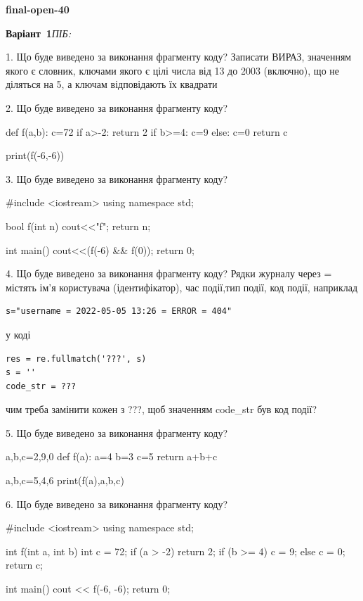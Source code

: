 \documentclass[11pt]{article}
\begin{document}
{\large\textbf{final-open-40}}

\textbf{Варіант \No\,1}\hfill \textit{ПІБ:}\,\underline{\hspace{60mm}}
\vspace{4mm}

1. Що буде виведено за виконання фрагменту коду?
Записати ВИРАЗ, значенням якого є словник, ключами якого є цілі числа від 13 до 2003 (включно), що не діляться на 5, а ключам відповідають їх квадрати 

2. Що буде виведено за виконання фрагменту коду?

def f(a,b):
    c=72
    if a>-2:
        return 2
    if b>=4:
         c=9
    else: 
        c=0
    return c

print(f(-6,-6))

3. Що буде виведено за виконання фрагменту коду?

#include <iostream>
using namespace std;

bool f(int n){
    cout<<"f";
    return n;
}

int main(){
    cout<<(f(-6) && f(0));
    return 0;
}

4. Що буде виведено за виконання фрагменту коду?
Рядки журналу через = містять ім'я користувача (ідентифікатор), час події,тип події, код події, наприклад
\begin{verbatim}
s="username = 2022-05-05 13:26 = ERROR = 404"
\end{verbatim}
у коді 
\begin{verbatim}
res = re.fullmatch('???', s) 
s = ''
code_str = ??? 
\end{verbatim}
чим треба замінити кожен з ???, щоб значенням code\_str був код події? 



5. Що буде виведено за виконання фрагменту коду?

a,b,c=2,9,0
def f(a):
    a=4
    b=3
    c=5
    return a+b+c

a,b,c=5,4,6
print(f(a),a,b,c)

6. Що буде виведено за виконання фрагменту коду?

#include <iostream>
using namespace std;

int f(int a, int b){
    int c = 72;
    if (a > -2)
        return 2;
    if (b >= 4)
         c = 9;
    else 
        c = 0;
    return c;
}

int main(){
    cout << f(-6, -6);
    return 0;
}
\end{document}
